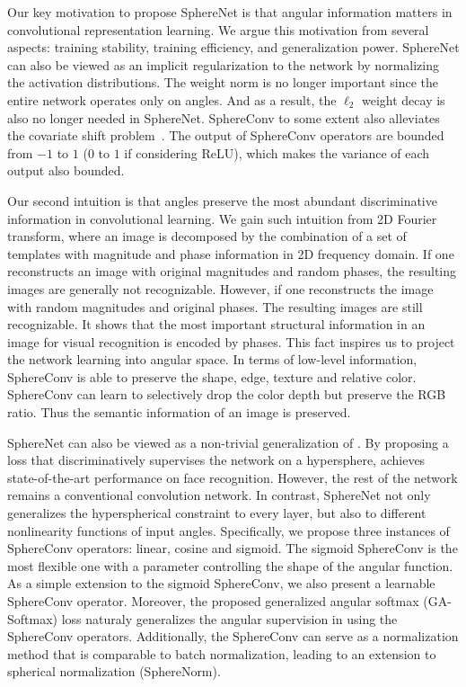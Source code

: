 Our key motivation to propose SphereNet is that angular information matters in convolutional representation learning. We argue this motivation from several aspects: training stability, training efficiency, and generalization power. SphereNet can also be viewed as an implicit regularization to the network by normalizing the activation distributions. The weight norm is no longer important since the entire network operates only on angles. And as a result, the $\ell_2$ weight decay is also no longer needed in SphereNet. SphereConv to some extent also alleviates the covariate shift problem~\cite{ioffe2015batch}. The output of SphereConv operators are bounded from $-1$ to $1$ ($0$ to $1$ if considering ReLU), which makes the variance of each output also bounded.
\par
Our second intuition is that angles preserve the most abundant discriminative information in convolutional learning. We gain such intuition from 2D Fourier transform, where an image is decomposed by the combination of a set of templates with magnitude and phase information in 2D frequency domain. If one reconstructs an image with original magnitudes and random phases, the resulting images are generally not recognizable. However, if one reconstructs the image with random magnitudes and original phases. The resulting images are still recognizable. It shows that the most important structural information in an image for visual recognition is encoded by phases. This fact inspires us to project the network learning into angular space. In terms of low-level information, SphereConv is able to preserve the shape, edge, texture and relative color. SphereConv can learn to selectively drop the color depth but preserve the RGB ratio. Thus the semantic information of an image is preserved.
\par
SphereNet can also be viewed as a non-trivial generalization of \cite{liu2016large,liu2017sphereface}. By proposing a loss that discriminatively supervises the network on a hypersphere, \cite{liu2017sphereface} achieves state-of-the-art performance on face recognition. However, the rest of the network remains a conventional convolution network. In contrast, SphereNet not only generalizes the hyperspherical constraint to every layer, but also to different nonlinearity functions of input angles. Specifically, we propose three instances of SphereConv operators: linear, cosine and sigmoid. The sigmoid SphereConv is the most flexible one with a parameter controlling the shape of the angular function. As a simple extension to the sigmoid SphereConv, we also present a learnable SphereConv operator. Moreover, the proposed generalized angular softmax (GA-Softmax) loss naturaly generalizes the angular supervision in \cite{liu2017sphereface} using the SphereConv operators. Additionally, the SphereConv can serve as a normalization method that is comparable to batch normalization, leading to an extension to spherical normalization (SphereNorm).

